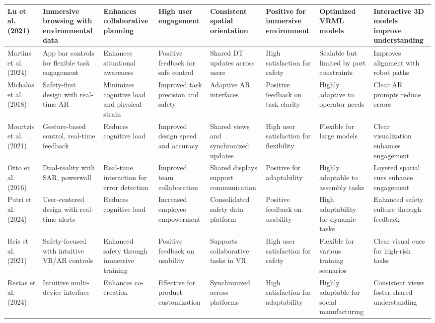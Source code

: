 {\begin{landscape}
\begin{longtable}{@{}p{1.8cm}p{1.8cm}p{1.8cm}p{1.8cm}p{1.8cm}p{1.8cm}p{1.8cm}p{1.8cm}@{}}
\midrule
Lu et al. (2021) & Immersive browsing with environmental data & Enhances collaborative planning & High user engagement & Consistent spatial orientation & Positive for immersive environment & Optimized VRML models & Interactive 3D models improve understanding \\
\midrule
Martins et al. (2024) & App bar controls for flexible task engagement & Enhances situational awareness & Positive feedback for safe control & Shared DT updates across users & High satisfaction for safety & Scalable but limited by port constraints & Improves alignment with robot paths \\
\midrule
Michalos et al. (2018) & Safety-first design with real-time AR & Minimizes cognitive load and physical strain & Improved task precision and safety & Adaptive AR interfaces & Positive feedback on task clarity & Highly adaptive to operator needs & Clear AR prompts reduce errors \\
\midrule
Mourtzis et al. (2021) & Gesture-based control, real-time feedback & Reduces cognitive load & Improved design speed and accuracy & Shared views and synchronized updates & High user satisfaction for flexibility & Flexible for large models & Clear visualization enhances engagement \\
\midrule
Otto et al. (2016) & Dual-reality with SAR, powerwall & Real-time interaction for error detection & Improved team collaboration & Shared displays support communication & Positive for adaptability & Highly adaptable to assembly tasks & Layered spatial cues enhance engagement \\
\midrule
Putri et al. (2024) & User-centered design with real-time alerts & Reduces cognitive load & Increased employee empowerment & Consolidated safety data platform & Positive feedback on usability & High adaptability for dynamic tasks & Enhanced safety culture through feedback \\
\midrule
Reis et al. (2021) & Safety-focused with intuitive VR/AR controls & Enhanced safety through immersive training & Positive feedback on usability & Supports collaborative tasks in VR & High user satisfaction for safety & Flexible for various training scenarios & Clear visual cues for high-risk tasks \\
\midrule
Restas et al. (2024) & Intuitive multi-device interface & Enhances co-creation & Effective for product customization & Synchronized across platforms & High satisfaction for adaptability & Highly adaptable for social manufacturing & Consistent views foster shared understanding \\

\end{longtable}
\end{landscape}}

